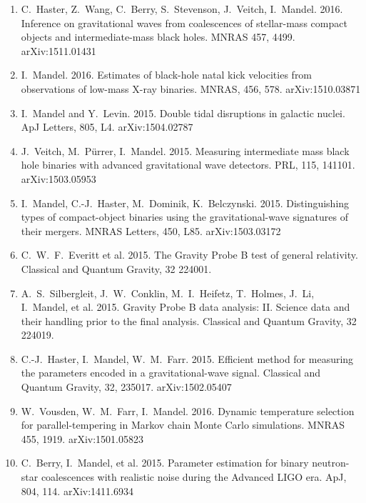 \documentclass[margin,line]{res}
\begin{document}
\begin{resume}
\begin{enumerate}
\item C.~Haster, Z.~Wang, C.~Berry, S.~Stevenson, J.~Veitch, I.~Mandel.  2016. Inference on gravitational waves from coalescences of stellar-mass compact objects and intermediate-mass black holes.   MNRAS 457, 4499.  arXiv:1511.01431 

\item I.~Mandel. 2016. Estimates of black-hole natal kick velocities from observations of low-mass X-ray binaries. MNRAS, 456, 578. arXiv:1510.03871

\item  I.~Mandel and Y.~Levin.  2015.  Double tidal disruptions in galactic nuclei.  ApJ Letters, 805, L4.  arXiv:1504.02787

\item  J.~Veitch, M.~P\"urrer, I.~Mandel. 2015. Measuring intermediate mass black hole binaries with advanced gravitational wave detectors. PRL, 115, 141101. arXiv:1503.05953 

\item  I.~Mandel, C.-J.~Haster, M.~Dominik, K.~Belczynski.  2015.  Distinguishing types of compact-object binaries using the gravitational-wave signatures of their mergers.  MNRAS Letters, 450, L85. arXiv:1503.03172

\item C.~W.~F.~Everitt et al.  2015.  The Gravity Probe B test of general relativity.  Classical and Quantum Gravity, 32 224001.

\item A.~S.~Silbergleit, J.~W.~Conklin, M.~I.~Heifetz, T.~Holmes, J.~Li, I.~Mandel, et al. 2015.
Gravity Probe B data analysis: II. Science data and their handling prior to the final analysis.  Classical and Quantum Gravity, 32 224019.

\item  C.-J.~Haster, I.~Mandel,  W.~M.~Farr.  2015.  Efficient method for measuring the parameters encoded in a gravitational-wave signal.  Classical and Quantum Gravity, 32, 235017. arXiv:1502.05407

\item W.~Vousden, W.~M.~Farr, I.~Mandel.  2016. Dynamic temperature selection for parallel-tempering in Markov chain Monte Carlo simulations.  MNRAS 455, 1919. arXiv:1501.05823 

\item  C.~Berry, I.~Mandel, et al. 2015. Parameter estimation for binary neutron-star coalescences with realistic noise during the Advanced LIGO era.  ApJ, 804, 114.  arXiv:1411.6934


\end{enumerate}
\end{resume}
\end{document}
